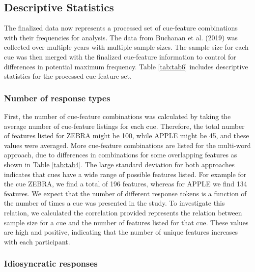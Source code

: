 \documentclass[man]{apa6}
\begin{document}
\hypertarget{descriptive-statistics}{%
\subsection{Descriptive Statistics}\label{descriptive-statistics}}

The finalized data now represents a processed set of cue-feature combinations with their frequencies for analysis. The data from Buchanan et al. (2019) was collected over multiple years with multiple sample sizes. The sample size for each cue was then merged with the finalized cue-feature information to control for differences in potential maximum frequency. Table \ref{tab:tab6} includes descriptive statistics for the processed cue-feature set.

\hypertarget{number-of-response-types}{%
\subsubsection{Number of response types}\label{number-of-response-types}}

First, the number of cue-feature combinations was calculated by taking the average number of cue-feature listings for each cue. Therefore, the total number of features listed for ZEBRA might be 100, while APPLE might be 45, and these values were averaged. More cue-feature combinations are listed for the multi-word approach, due to differences in combinations for some overlapping features as shown in Table \ref{tab:tab4}. The large standard deviation for both approaches indicates that cues have a wide range of possible features listed. For example for the cue ZEBRA, we find a total of 196 features, whereas for APPLE we find 134 features. We expect that the number of different response tokens is a function of the number of times a cue was presented in the study. To investigate this relation, we calculated the correlation provided represents the relation between sample size for a cue and the number of features listed for that cue. These values are high and positive, indicating that the number of unique features increases with each participant.

\hypertarget{idiosyncratic-responses}{%
\subsubsection{Idiosyncratic responses}\label{idiosyncratic-responses}}
\end{document}
